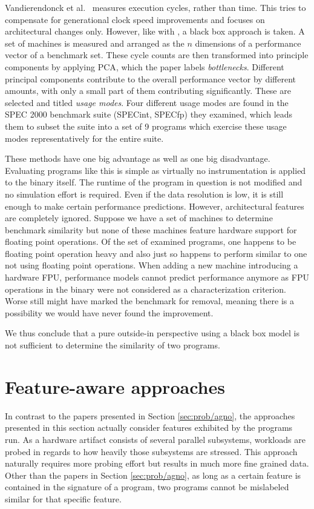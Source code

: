 \documentclass[../bachelor_paper.tex]{subfiles}
\begin{document}
Vandierendonck et al.\ \cite{vandierendonckManyBenchmarksStress2004} measures execution cycles, rather than time. This tries to compensate for generational clock speed improvements and focuses on architectural changes only. However, like with \cite{dujmovicEvolutionEvaluationSPEC1998}, a black box approach is taken. A set of machines is measured and arranged as the $n$ dimensions of a performance vector of a benchmark set. These cycle counts are then transformed into principle components by applying \ac{PCA}, which the paper labels \emph{bottlenecks}. Different principal components contribute to the overall performance vector by different amounts, with only a small part of them contributing significantly. These are selected and titled \emph{usage modes}. Four different usage modes are found in the \ac{SPEC} 2000 benchmark suite (\acs{SPEC}int, \acs{SPEC}fp) they examined, which leads them to subset the suite into a set of 9 programs which exercise these usage modes representatively for the entire suite.

These methods have one big advantage as well as one big disadvantage. Evaluating programs like this is simple as virtually no instrumentation is applied to the binary itself. The runtime of the program in question is not modified and no simulation effort is required. Even if the data resolution is low, it is still enough to make certain performance predictions. However, architectural features are completely ignored. Suppose we have a set of machines to determine benchmark similarity but none of these machines feature hardware support for floating point operations. Of the set of examined programs, one happens to be floating point operation heavy and also just so happens to perform similar to one not using floating point operations. When adding a new machine introducing a hardware \ac{FPU}, performance models cannot predict performance anymore as \ac{FPU} operations in the binary were not considered as a characterization criterion. Worse still \cite{vandierendonckManyBenchmarksStress2004} might have marked the benchmark for removal, meaning there is a possibility we would have never found the improvement.

We thus conclude that a pure outside-in perspective using a black box model is not sufficient to determine the similarity of two programs.

\section{Feature-aware approaches}
	\label{sec:prob/aware}
In contrast to the papers presented in Section \ref{sec:prob/agno}, the approaches presented in this section actually consider features exhibited by the programs run. As a hardware artifact consists of several parallel subsystems, workloads are probed in regards to how heavily those subsystems are stressed. This approach naturally requires more probing effort but results in much more fine grained data. Other than the papers in Section \ref{sec:prob/agno}, as long as a certain feature is contained in the signature of a program, two programs cannot be mislabeled similar for that specific feature.
\end{document}
